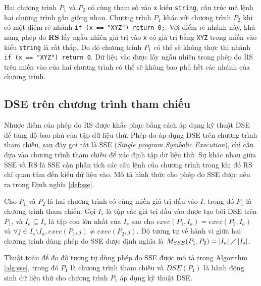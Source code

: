 Hai chương trình $P_{1}$ và $P_{2}$ có cùng tham số vào \texttt{x} kiểu \texttt{string}, cấu trúc mã lệnh hai chương trình gần giống nhau. Chương trình $P_{1}$ khác với chương trình $P_{2}$ khi có một điểm rẻ nhánh \texttt{if (x == "XYZ") return 0;}. Với điểm rẻ nhánh này, khả năng phép đo \textbf{RS} lấy ngẫu nhiên giá trị vào \texttt{x} có giá trị bằng \texttt{XYZ} trong miền vào kiểu \texttt{string} là rất thấp. Do đó chương trình $P_{1}$ có thể sẽ không thực thi nhánh \texttt{if (x == "XYZ") return 0}. Dữ liệu vào được lấy ngẫu nhiên trong phép đo RS trên miền vào của hai chương trình có thể sẽ không bao phủ hết các nhánh của chương trình.

\subsection{DSE trên chương trình tham chiếu}

Nhược điểm của phép đo RS được khắc phục bằng cách áp dụng kỹ thuật
DSE để tăng độ bao phủ của tập dữ liệu thử. Phép đo áp dụng DSE trên
chương trình tham chiếu, sau đây gọi tắt là SSE (\emph{Single program
  Symbolic Execution}), chỉ cần dựa vào chương trình tham chiếu để xác
định tập dữ liệu thử. Sự khác nhau giữa SSE và RS là SSE cần phần tích
các câu lệnh của chương trình trong khi đó RS chỉ quan tâm đến kiểu dữ
liệu vào. Mô tả hình thức cho phép đo SSE được nêu ra trong Định nghĩa
\ref{def:sse}.

\begin{definition}
  \label{def:sse}
  Cho $P_{1}$ và $P_{2}$ là hai chương trình có cùng miền giá trị đầu
  vào $I$, trong đó $P_{1}$ là chương trình tham chiếu. Gọi $I_{s}$ là
  tập các giá trị đầu vào được tạo bởi DSE trên $P_{1}$, và
  $I_{a} \subseteq I_s$ là tập con lớn nhất của $I_{s}$ sao cho
  $exec(P_{1}, I_a) = exec(P_{2}, I_a)$ và
  $\forall j \in I_{s} \setminus I_{a}, exec(P_{1}, j) \neq
  exec(P_{2}, j)$. Độ tương tự về hành vi giữa hai chương trình dùng
  phép đo SSE được định nghĩa là
  $M_{SSE}(P_{1}, P_{2}) = \left|I_{a}\right| \diagup
  \left|I_{s}\right| $.
\end{definition}

Thuật toán để đo độ tương tự dùng phép đo SSE được mô tả trong
Algorithm \ref{alg:sse}, trong đó $P_1$ là chương trình tham chiếu và
$DSE(P_{1})$ là hành động sinh dữ liệu thử cho chương trình $P_1$ áp
dụng kỹ thuật DSE.

